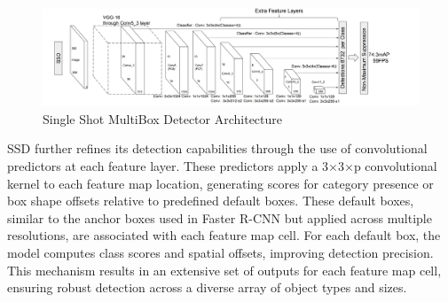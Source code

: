 \begin{figure}[h!]
    \centering
    \includegraphics[scale=0.55]{Figures/ssmbd.jpg}
    \caption{Single Shot MultiBox Detector Architecture}
    \label{fig:ssmd}
\end{figure}

SSD further refines its detection capabilities through the use of convolutional predictors at each feature layer. These predictors apply a 3×3×p 
convolutional kernel to each feature map location, generating scores for category presence or box shape offsets relative to predefined default boxes. 
These default boxes, similar to the anchor boxes used in Faster R-CNN but applied across multiple resolutions, are associated with each feature map cell. 
For each default box, the model computes class scores and spatial offsets, improving detection precision. This mechanism results in an extensive set of outputs 
for each feature map cell, ensuring robust detection across a diverse array of object types and sizes.





